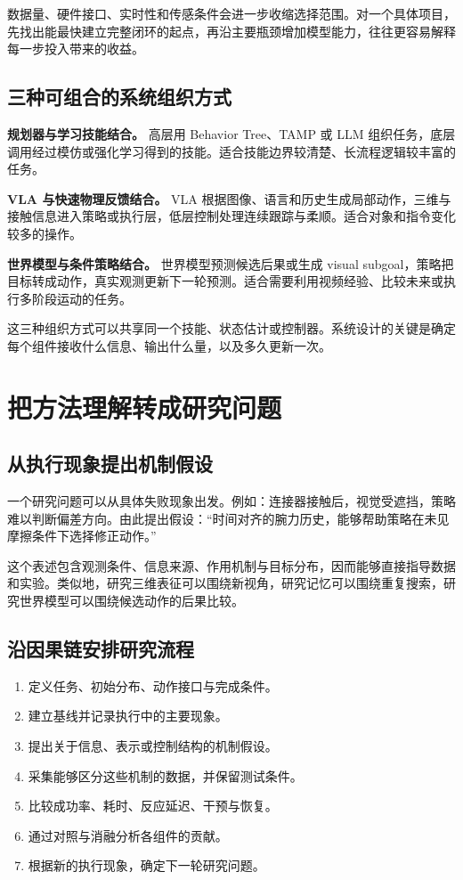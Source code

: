 \documentclass[UTF8,a4paper,11pt,oneside,openany,fontset=none]{ctexbook}
\begin{document}
数据量、硬件接口、实时性和传感条件会进一步收缩选择范围。对一个具体项目，先找出能最快建立完整闭环的起点，再沿主要瓶颈增加模型能力，往往更容易解释每一步投入带来的收益。

\section{三种可组合的系统组织方式}

\textbf{规划器与学习技能结合。} 高层用 Behavior Tree、TAMP 或 LLM 组织任务，底层调用经过模仿或强化学习得到的技能。适合技能边界较清楚、长流程逻辑较丰富的任务。

\textbf{VLA 与快速物理反馈结合。} VLA 根据图像、语言和历史生成局部动作，三维与接触信息进入策略或执行层，低层控制处理连续跟踪与柔顺。适合对象和指令变化较多的操作。

\textbf{世界模型与条件策略结合。} 世界模型预测候选后果或生成 visual subgoal，策略把目标转成动作，真实观测更新下一轮预测。适合需要利用视频经验、比较未来或执行多阶段运动的任务。

这三种组织方式可以共享同一个技能、状态估计或控制器。系统设计的关键是确定每个组件接收什么信息、输出什么量，以及多久更新一次。

\chapter{把方法理解转成研究问题}

\section{从执行现象提出机制假设}

一个研究问题可以从具体失败现象出发。例如：连接器接触后，视觉受遮挡，策略难以判断偏差方向。由此提出假设：``时间对齐的腕力历史，能够帮助策略在未见摩擦条件下选择修正动作。''

这个表述包含观测条件、信息来源、作用机制与目标分布，因而能够直接指导数据和实验。类似地，研究三维表征可以围绕新视角，研究记忆可以围绕重复搜索，研究世界模型可以围绕候选动作的后果比较。

\section{沿因果链安排研究流程}

\begin{enumerate}
\def\labelenumi{\arabic{enumi}.}
\tightlist
\item
  定义任务、初始分布、动作接口与完成条件。
\item
  建立基线并记录执行中的主要现象。
\item
  提出关于信息、表示或控制结构的机制假设。
\item
  采集能够区分这些机制的数据，并保留测试条件。
\item
  比较成功率、耗时、反应延迟、干预与恢复。
\item
  通过对照与消融分析各组件的贡献。
\item
  根据新的执行现象，确定下一轮研究问题。
\end{enumerate}
\end{document}
